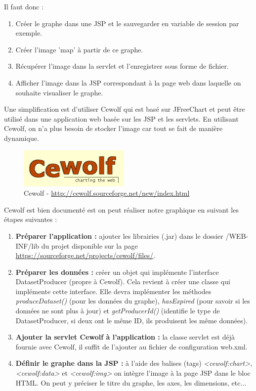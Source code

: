 Il faut donc :
\begin{enumerate}
 \item Créer le graphe dans une JSP et le sauvegarder en variable de session par exemple.
 \item Créer l'image 'map' à partir de ce graphe.
 \item Récupérer l'image dans la servlet et l'enregistrer sous forme de fichier.
 \item Afficher l'image dans la JSP correspondant à la page web dans laquelle on souhaite visualiser le graphe.
\end{enumerate}

Une simplification est d'utiliser Cewolf qui est basé sur JFreeChart et peut être utilisé dans une application web basée sur les JSP et les servlets. En utilisant Cewolf, on n'a plus besoin de stocker l'image car tout se fait de manière dynamique.\\
\begin{figure}[H]
  \center
  \includegraphics[scale=0.5]{../graph/Cewolf.png}
  \caption{Cewolf - \url{http://cewolf.sourceforge.net/new/index.html}}
\end{figure}

Cewolf est bien documenté est on peut réaliser notre graphique en suivant les étapes suivantes :
\begin{enumerate}
 \item \textbf{Préparer l'application :} ajouter les librairies (.jar) dans le dossier /WEB-INF/lib du projet disponible sur la page \url{https://sourceforge.net/projects/cewolf/files/}.
 \item \textbf{Préparer les données :} créer un objet qui implémente l'interface DatasetProducer (propre à Cewolf). Cela revient à créer une classe qui implémente cette interface. Elle devra implémenter les méthodes \textit{produceDataset()} (pour les données du graphe), \textit{hasExpired} (pour savoir si les données ne sont plus à jour) et \textit{getProducerId()} (identifie le type de DatasetProducer, si deux ont le même ID, ils produisent les même données).
 \item \textbf{Ajouter la servlet Cewolf à l'application :} la classe servlet est déjà fournie avec Cewolf, il suffit de l'ajouter au fichier de configuration web.xml.
 \item \textbf{Définir le graphe dans la JSP :} à l'aide des balises (tags) \textit{<cewolf:chart>}, \textit{<cewolf:data>} et \textit{<cewolf:img>} on intègre l'image à la page JSP dans le bloc HTML. On peut y préciser le titre du graphe, les axes, les dimensions, etc...
\end{enumerate}

